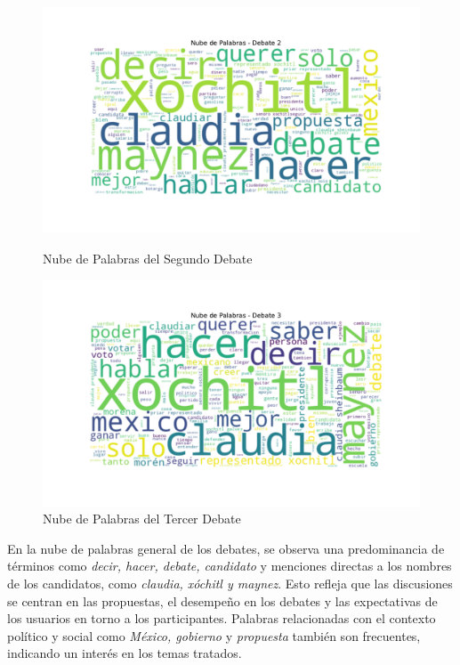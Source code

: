 \documentclass[10pt, a4paper]{article}
\begin{document}
	\vspace{-2mm}
	\begin{figure}[h!]
		\centering
		\begin{minipage}{0.49\textwidth} %
			\includegraphics[width=\linewidth]{nube_palabras_debate_2.pdf} 
			\vspace{-10mm}
			\caption{Nube de Palabras del Segundo Debate}
			\label{fig:nubeDebate2}
		\end{minipage}
		\hfill %
		\begin{minipage}{0.49\textwidth}
			\includegraphics[width=\linewidth]{nube_palabras_debate_3.pdf}
			\vspace{-10mm}
			\caption{Nube de Palabras del Tercer Debate}
			\label{fig:nubeDebate3}
		\end{minipage}
	\end{figure}

	En la nube de palabras general de los debates, se observa una predominancia de términos como \textit{decir, hacer, debate, candidato} y menciones directas a los nombres de los candidatos, como \textit{claudia, xóchitl y maynez}. Esto refleja que las discusiones se centran en las propuestas, el desempeño en los debates y las expectativas de los usuarios en torno a los participantes. Palabras relacionadas con el contexto político y social como \textit{México, gobierno} y \textit{propuesta} también son frecuentes, indicando un interés en los temas tratados.
	
\end{document}
